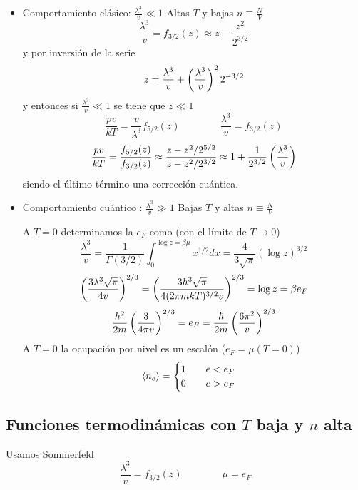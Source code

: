 \documentclass[10pt,oneside]{CBFT_book}
\begin{document}
\begin{itemize}
 \item Comportamiento clásico: $\frac{\lambda^3}{v} \ll 1$ Altas $T$ y bajas $n\equiv \frac{N}{V}$ 
 \[
	\frac{\lambda^3}{v} = f_{3/2}(z) \approx z - \frac{z^2}{2^{3/2}}
 \]
 y por inversión de la serie 
 \[
	z = \frac{\lambda^3}{v} + \left( \frac{ \lambda^3 }{ v } \right)^2 2^{-3/2}
 \]
 y entonces si $\frac{\lambda^3}{v} \ll 1$ se tiene que $ z \ll 1 $
 \[
	\frac{pv}{kT} = \frac{v}{\lambda^3} f_{5/2}(z) \qquad \qquad \frac{\lambda^3}{v} = f_{3/2}(z)
 \]
 \[
	\frac{pv}{kT} = \frac{f_{5/2}(z)}{f_{3/2}(z)} \approx \frac{z - z^2/2^{5/2}}{z - z^2/2^{3/2}}
	\approx 1 + \frac{1}{2^{3/2}} \left( \frac{ \lambda^3 }{ v } \right)
 \]
 siendo el último término una corrección cuántica.
 
  \item Comportamiento cuántico : $\frac{\lambda^3}{v} \gg 1$ Bajas $T$ y altas $n\equiv \frac{N}{V}$ 
  
  A $ T = 0 $ determinamos la $ e_F $ como (con el límite de $T\to 0$)
  \[
	\frac{\lambda^3}{v} = \frac{1}{\Gamma(3/2)} \int_0^{\log z = \beta\mu} x^{1/2} dx = 
	 \frac{4}{ 3 \sqrt{\pi} } (\log z )^{3/2}
  \]
  \[
	\left( \frac{  3  \lambda^3  \sqrt{\pi}  }{ 4v } \right)^{2/3} = \left( \frac{  3  h^3  \sqrt{\pi}  }{ 4(2\pi m k T)^{3/2}v } \right)^{2/3} 
	= \log z =  \beta e_F
  \]
  \[
	\frac{h^2}{2m}\left( \frac{ 3 }{ 4\pi v } \right)^{2/3} = e_F = \frac{\hbar}{2m}\left( \frac{ 6\pi^2 }{ v } \right)^{2/3}
  \]
  A $ T = 0 $ la ocupación por nivel es un escalón ($e_F = \mu(T=0) $) 
  \[
	\braket{n_e} = 	\begin{cases}
			1 \qquad e < e_F \\
			0 \qquad e > e_F
			\end{cases}
  \]
\end{itemize}

\subsection{Funciones termodinámicas con $T$ baja y $n$ alta}

Usamos Sommerfeld
\[
	\frac{\lambda^3}{v} = f_{3/2}(z) \qquad  \qquad \mu = e_F
\]




\end{document}
